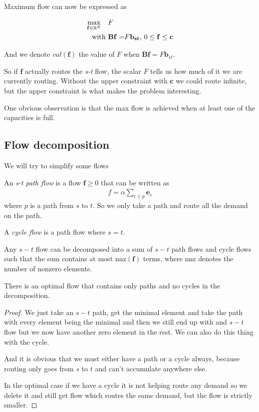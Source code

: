 Maximum flow can now be expressed as

\begin{align}
    \max_{\mathbf{f} \in \mathbb{R} ^E}  \quad &F \\
    \text{with } &\mathbf{Bf =} F \mathbf{b_{st}}, \, 0\leq \mathbf{f \leq c}
\end{align}

And we denote $val(\mathbf{f})$ the value of $F$ when $\mathbf{Bf} = F \mathbf{b}_{st}$.

So if $\mathbf{f}$ actually routes the \textit{s-t} flow, the scalar $F$ tells us how much of it we are currently routing. Without the upper constraint with $\mathbf{c}$ we could route infinite, but the upper constraint is what makes the problem interesting.

One obvious observation is that the max flow is achieved when at least one of the capacities is full.

\subsection{Flow decomposition}
We will try to simplify some flows
\begin{definicija}
    An \emph{s-t path flow} is a flow $\mathbf{f}\geq 0$ that can be written as 
    \begin{align*}
        f = \alpha \sum_{e \in p} \mathbf{e}_e
    \end{align*}
    where $p$ is a path from $s$ to $t$. So we only take a path and route all the demand on the path.
\end{definicija}

\begin{definicija}
    A \textit{cycle flow} is a path flow where $s = t$.
\end{definicija}

\begin{lema}

Any $s-t$ flow can be decomposed into a sum of $s-t$ path flows and cycle flows such that the sum contains at most $\text{nnz}(\mathbf{f})$ terms, where $\text{nnz}$ denotes the number of nonzero elements.

There is an optimal flow that contains only paths and no cycles in the decomposition.
    
\end{lema}

\begin{proof}
    We just take an $s-t$ path, get the minimal element and take the path with every element being the minimal and then we still end up with and $s-t$ flow but we now have another zero element in the rest. We can also do this thing with the cycle.

    And it is obvious that we must either have a path or a cycle always, because routing only goes from $s$ to $t$ and can't accumulate anywhere else.

    In the optimal case if we have a cycle it is not helping route any demand so we delete it and still get flow which routes the same demand, but the flow is strictly smaller.
\end{proof}

